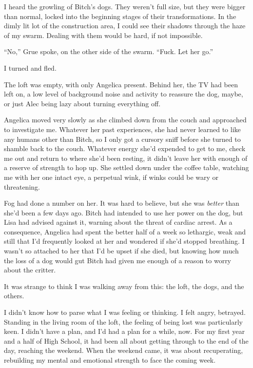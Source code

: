 I heard the growling of Bitch's dogs.  They weren't full size, but they were bigger than normal, locked into the beginning stages of their transformations.  In the dimly lit lot of the construction area, I could see their shadows through the haze of my swarm.  Dealing with them would be hard, if not impossible.



``No,'' Grue spoke, on the other side of the swarm.  ``Fuck.  Let her go.''



I turned and fled.



\sectionbreak



The loft was empty, with only Angelica present.  Behind her, the TV had been left on, a low level of background noise and activity to reassure the dog, maybe, or just Alec being lazy about turning everything off.



Angelica moved very slowly as she climbed down from the couch and approached to investigate me.  Whatever her past experiences, she had never learned to like any humans other than Bitch, so I only got a cursory sniff before she turned to shamble back to the couch.  Whatever energy she'd expended to get to me, check me out and return to where she'd been resting, it didn't leave her with enough of a reserve of strength to hop up.  She settled down under the coffee table, watching me with her one intact eye, a perpetual wink, if winks could be wary or threatening.



Fog had done a number on her.  It was hard to believe, but she was \emph{better} than she'd been a few days ago.  Bitch had intended to use her power on the dog, but Lisa had advised against it, warning about the threat of cardiac arrest.  As a consequence, Angelica had spent the better half of a week so lethargic, weak and still that I'd frequently looked at her and wondered if she'd stopped breathing.  I wasn't so attached to her that I'd be upset if she died, but knowing how much the loss of a dog would gut Bitch had given me enough of a reason to worry about the critter.



It was strange to think I was walking away from this: the loft, the dogs, and the others.



I didn't know how to parse what I was feeling or thinking.  I felt angry, betrayed.  Standing in the living room of the loft, the feeling of being lost was particularly keen.  I didn't have a plan, and I'd had a plan for a while, now.  For my first year and a half of High School, it had been all about getting through to the end of the day, reaching the weekend.  When the weekend came, it was about recuperating, rebuilding my mental and emotional strength to face the coming week.



